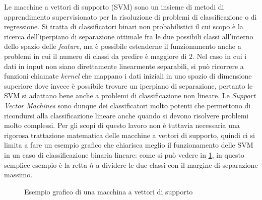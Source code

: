 \documentclass[12pt,a4paper,oneside]{article}
\begin{document}
Le macchine a vettori di supporto (\gls{SVM}) \cite{STATISTICAL_ELEMENTS} sono un insieme di metodi di apprendimento supervisionato per la risoluzione di problemi di classificazione o di regressione. Si tratta di classificatori binari non probabilistici il cui scopo è la ricerca dell'iperpiano di separazione ottimale fra le due possibili classi all'interno dello spazio delle \textit{feature}, ma è possibile estenderne il funzionamento anche a problemi in cui il numero di classi da predire è maggiore di $2$. Nel caso in cui i dati in input non siano direttamente linearmente separabili, si può ricorrere a funzioni chiamate \textit{kernel} che mappano i dati iniziali in uno spazio di dimensione superiore dove invece è possibile trovare un iperpiano di separazione, pertanto le \gls{SVM} si adattano bene anche a problemi di classificazione non lineare. Le \textit{Support Vector Machines} sono dunque dei classificatori molto potenti che permettono di ricondursi alla classificazione lineare anche quando si devono risolvere problemi molto complessi. Per gli scopi di questo lavoro non è tuttavia necessaria una rigorosa trattazione matematica delle macchine a vettori di supporto, quindi ci si limita a fare un esempio grafico che chiarisca meglio il funzionamento delle \gls{SVM} in un caso di classificazione binaria lineare: come si può vedere in \cref{fig:svm}, in questo semplice esempio è la retta $h$ a dividere le due classi con il margine di separazione massimo.
\begin{figure}[!htb]
    \centering
    \caption{Esempio grafico di una macchina a vettori di supporto}\label{fig:svm}
\end{figure}
\end{document}
